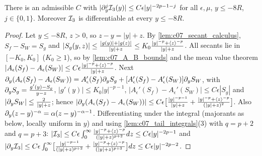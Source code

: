 \begin{lemma}
  \label{lem:c07_negative_I3}
  There is an admissible $C$ with $|\partial_y^j\mathcal{I}_3(y)|\le C\epsilon|y|^{-2p-1-j}$ for all $\epsilon,\mu$, $y\le-8R$, $j\in\{0,1\}$.
  Moreover $\mathcal{I}_3$ is differentiable at every $y\le-8R$.
\end{lemma}
\begin{proof}
  Let $y\le-8R$, $z>0$, so $z-y=|y|+z$. By \cref{lem:c07_secant_calculus}, $S_f-S_W=S_g$ and
  $|S_g(y,z)|\le\frac{|g(y)|+|g(z)|}{|y|+z}\le K_0\frac{|y|^{-p}+\langle z \rangle^{-p}}{|y|+z}$. All secants lie in
  $[-K_0,K_0]$ ($K_0\ge1$), so by \cref{lem:c07_A_B_bounds} and the mean value theorem
  $|A_\epsilon(S_f)-A_\epsilon(S_W)|\le C\epsilon\frac{|y|^{-p}+\langle z \rangle^{-p}}{|y|+z}$. Next
  $\partial_y(A_\epsilon(S_f)-A_\epsilon(S_W))=A_\epsilon'(S_f)\partial_yS_g+[A_\epsilon'(S_f)-A_\epsilon'(S_W)]\partial_yS_W$, with
  $\partial_yS_g=\frac{g'(y)-S_g}{y-z}$, $|g'(y)|\le K_0|y|^{-p-1}$, $|A_\epsilon'(S_f)-A_\epsilon'(S_W)|\le C\epsilon|S_g|$ and
  $|\partial_yS_W|\le\frac2{|y|+z}$; hence
  $|\partial_y(A_\epsilon(S_f)-A_\epsilon(S_W))|\le C\epsilon\bigl[\frac{|y|^{-p-1}}{|y|+z}+\frac{|y|^{-p}+\langle z \rangle^{-p}}{(|y|+z)^2}\bigr]$.
  Also $\partial_y(z-y)^{-\alpha}=\alpha(z-y)^{-\alpha-1}$. Differentiating under the integral (majorants as below,
  locally uniform in $y$) and using \cref{lem:c07_tail_integrals}(3) with $q=p+2$ and $q=p+3$:
  $|\mathcal{I}_3|\le C\epsilon\int_0^\infty\frac{|y|^{-p}+\langle z \rangle^{-p}}{(|y|+z)^{p+2}}dz\le C\epsilon|y|^{-2p-1}$ and
  $|\partial_y\mathcal{I}_3|\le C\epsilon\int_0^\infty\bigl[\frac{|y|^{-p-1}}{(|y|+z)^{p+2}}+\frac{|y|^{-p}+\langle z \rangle^{-p}}{(|y|+z)^{p+3}}\bigr]dz\le C\epsilon|y|^{-2p-2}$.
\end{proof}

